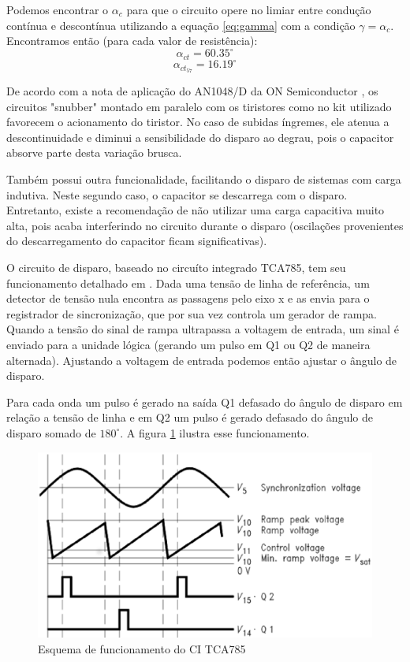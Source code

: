 \documentclass{article}
\begin{document}
Podemos encontrar o $\alpha_c$ para que o circuito opere no limiar entre condução contínua e descontínua utilizando a equação \ref{eq:gamma} com a condição $\gamma = \alpha_c$. Encontramos então (para cada valor de resistência):
\begin{equation}
\alpha_{ct} = 60.35^\circ
\end{equation}
\begin{equation}
\alpha_{{ct}_{57}} = 16.19^\circ
\end{equation}

De acordo com a nota de aplicação do AN1048/D da ON Semiconductor \cite{bb:apno}, os circuitos "snubber" montado em paralelo com os tiristores como no kit utilizado favorecem o acionamento do tiristor. No caso de subidas íngremes, ele atenua a descontinuidade e diminui a sensibilidade do disparo ao degrau, pois o capacitor absorve parte desta variação brusca. 

Também possui outra funcionalidade, facilitando o disparo de sistemas com carga indutiva. Neste segundo caso, o capacitor se descarrega com o disparo. Entretanto, existe a recomendação de não utilizar uma carga capacitiva muito alta, pois acaba interferindo no circuito durante o disparo (oscilações provenientes do descarregamento do capacitor ficam significativas).

O circuito de disparo, baseado no circuíto integrado TCA785, tem seu funcionamento detalhado em \cite{bb:datasheet}. Dada uma tensão de linha de referência, um detector de tensão nula encontra as passagens pelo eixo x e as envia para o registrador de sincronização, que por sua vez controla um gerador de rampa. Quando a tensão do sinal de rampa ultrapassa a voltagem de entrada, um sinal é enviado para a unidade lógica (gerando um pulso em Q1 ou Q2 de maneira alternada). Ajustando a voltagem de entrada podemos então ajustar o ângulo de disparo.

Para cada onda um pulso é gerado na saída Q1 defasado do ângulo de disparo em relação a tensão de linha e em Q2 um pulso é gerado defasado do ângulo de disparo somado de $180^\circ$. A figura \ref{fig:datasheet} ilustra esse funcionamento.

\begin{figure}[H]
	\centering
	\includegraphics[width=0.7\linewidth]{dados/datasheet}
	\caption{Esquema de funcionamento do CI TCA785 \cite{bb:datasheet}}
	\label{fig:datasheet}
\end{figure}


\end{document}

